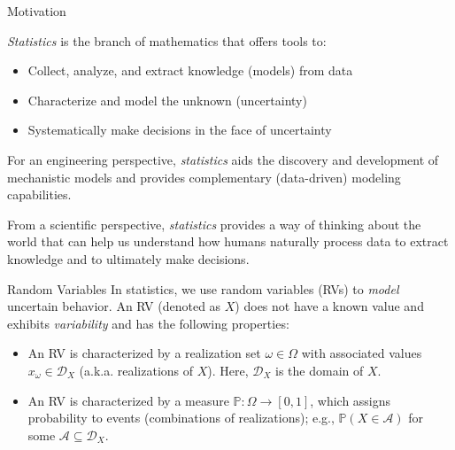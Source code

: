 \documentclass[9pt]{beamer}
\begin{document}
%
\begin{frame}{Motivation}

{\em Statistics} is the branch of mathematics that offers tools to: 
\begin{itemize}
\item Collect, analyze, and extract knowledge (models) from data 
\item Characterize and model the unknown (uncertainty) 
\item Systematically make decisions in the face of uncertainty
\end{itemize}

\begin{block}{}
For an engineering perspective, {\em statistics} aids the discovery and development of mechanistic models and provides complementary (data-driven) modeling capabilities.  
\end{block}

\begin{block}{}
From a scientific perspective, {\em statistics} provides a way of thinking about the world that can help us understand how humans naturally process data to extract knowledge and to ultimately make decisions. 
\end{block}
\end{frame}
%
\begin{frame}{Random Variables}
In statistics, we use random variables (RVs) to {\em model} uncertain behavior. An RV (denoted as $X$) does not have a known value and exhibits {\em variability} and has the following properties: 
\begin{block}{}
\begin{itemize}
\item An RV is characterized by a realization set $\omega \in \Omega$ with associated values $x_\omega\in \mathcal{D}_X$ (a.k.a. realizations of $X$).  Here, $\mathcal{D}_X$ is the domain of $X$.
\item An RV is characterized by a measure $\mathbb{P}:\Omega\to [0,1]$, which assigns probability to events (combinations of realizations); e.g., $\mathbb{P}(X\in \mathcal{A})$ for some $\mathcal{A}\subseteq \mathcal{D}_X$.
\end{itemize}
\end{block}
\end{frame}
\end{document}
